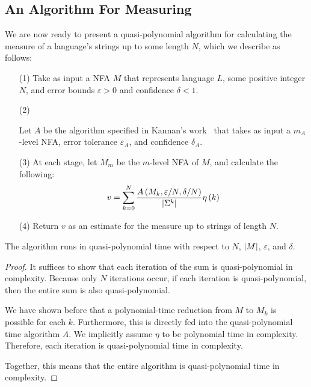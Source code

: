 \subsection{An Algorithm For Measuring}

We are now ready to present a
quasi-polynomial algorithm for calculating the
measure of a language's strings up to some length \(N\),
which we describe as follows:

\begin{enumerate}
  \item[(1)]
    Take as input a NFA \(M\) that represents language \(L\),
    some positive integer \(N\), and error bounds \(\varepsilon > 0\)
    and confidence \(\delta < 1\).

  \item[(2)]

    Let \(A\) be the algorithm specified in
    Kannan's work~\cite{acmsiam-kannan1995counting}
    that takes as input a \(m_A\)-level NFA,
    error tolerance \(\varepsilon_A\),
    and confidence \(\delta_A\).

  \item[(3)]
    At each stage, let \(M_m\) be the \(m\)-level NFA of \(M\), and
    calculate the following:
    \begin{align*}
      v =
      \sum_{k = 0}^{N}
        \frac{A\left(M_k, \varepsilon / N, \delta / N\right)}{\left\lvert\Sigma^k\right\rvert}
          \eta \left(k\right)
    \end{align*}

  \item[(4)]
    Return \(v\) as an estimate for the measure up to
    strings of length \(N\).
\end{enumerate}


\begin{theorem}
  The algorithm runs in quasi-polynomial time with respect to
  \(N\), \(\left\lvert M\right\rvert\), \(\varepsilon\), and \(\delta\).
\end{theorem}
\begin{proof}
  It suffices to show that each iteration of the sum is
  quasi-polynomial in complexity.
  Because only \(N\) iterations occur,
  if each iteration is quasi-polynomial,
  then the entire sum is also quasi-polynomial.

  We have shown before that a polynomial-time reduction from
  \(M\) to \(M_k\) is possible for each \(k\).
  Furthermore, this is directly fed into the
  quasi-polynomial time algorithm \(A\).
  We implicitly assume \(\eta\) to be polynomial time in complexity.
  Therefore, each iteration is quasi-polynomial time in complexity.

  Together, this means that the entire algorithm is
  quasi-polynomial time in complexity.
\end{proof}

